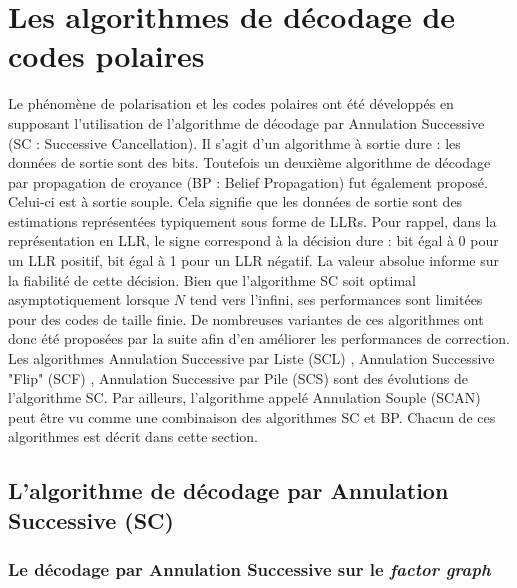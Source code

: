 \section{Les algorithmes de décodage de codes polaires}

Le phénomène de polarisation et les codes polaires ont été développés en supposant l'utilisation de l'algorithme de décodage par Annulation Successive (SC : Successive Cancellation). Il s'agit d'un algorithme à sortie dure : les données de sortie sont des bits. Toutefois un deuxième algorithme de décodage par propagation de croyance (BP : Belief Propagation) fut également proposé. Celui-ci est à sortie souple. Cela signifie que les données de sortie sont des estimations représentées typiquement sous forme de LLRs. Pour rappel, dans la représentation en LLR, le signe correspond à la décision dure : bit égal à 0 pour un LLR positif, bit égal à 1 pour un LLR négatif. 
La valeur absolue informe sur la fiabilité de cette décision. Bien que l'algorithme SC soit optimal asymptotiquement lorsque $N$ tend vers l'infini, ses performances sont limitées pour des codes de taille finie. De nombreuses variantes de ces algorithmes ont donc été proposées par la suite afin d'en améliorer les performances de correction. Les algorithmes Annulation Successive par Liste (SCL) \cite{tal_list_2011}, Annulation Successive "Flip" (SCF) \cite{afisiadis_low-complexity_2014}, Annulation Successive par Pile (SCS) \cite{niu_stack_2012} sont des évolutions de l'algorithme SC. Par ailleurs, l'algorithme appelé Annulation Souple (SCAN) \cite{fayyaz_low-complexity_2014} peut être vu comme une combinaison des algorithmes SC et BP. Chacun de ces algorithmes est décrit dans cette section.

\subsection{L'algorithme de décodage par Annulation Successive (SC)}

\subsubsection{Le décodage par Annulation Successive sur le \textit{factor graph}}

